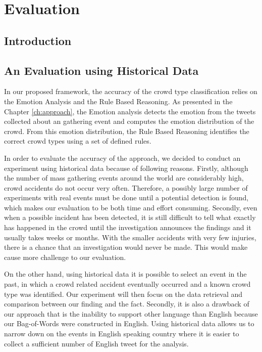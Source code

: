\chapter{Evaluation}
\label{ch:eval}
\ifpdf
    \graphicspath{{Chapter5/Figs/Raster/}{Chapter5/Figs/PDF/}{Chapter5/Figs/}}
\else
    \graphicspath{{Chapter5/Figs/Vector/}{Chapter5/Figs/}}
\fi

\section{Introduction}

\section{An Evaluation using Historical Data}
In our proposed framework, the accuracy of the crowd type classification relies on the Emotion Analysis and the Rule Based Reasoning. As presented in the Chapter \ref{ch:approach}, the Emotion analysis detects the emotion from the tweets collected about an gathering event and computes the emotion distribution of the crowd. From this emotion distribution, the Rule Based Reasoning identifies the correct crowd types using a set of defined rules. 

In order to evaluate the accuracy of the approach, we decided to conduct an experiment using historical data because of following reasons. Firstly, although the number of mass gathering events around the world are considerably high, crowd accidents do not occur very often. Therefore, a possibly large number of experiments with real events must be done until a potential detection is found, which makes our evaluation to be both time and effort consuming. Secondly, even when a possible incident has been detected, it is still difficult to tell what exactly has happened in the crowd until the investigation announces the findings and it usually takes weeks or months. With the smaller accidents with very few injuries, there is a chance that an investigation would never be made. This would make cause more challenge to our evaluation. 

On the other hand, using historical data it is possible to select an event in the past, in which a crowd related accident eventually occurred and a known crowd type was identified. Our experiment will then focus on the data retrieval and comparison between our finding and the fact. Secondly, it is also a drawback of our approach that is the inability to support other language than English because our Bag-of-Words were constructed in English. Using historical data allows us to narrow down on the events in English speaking country where it is easier to collect a sufficient number of English tweet for the analysis.

